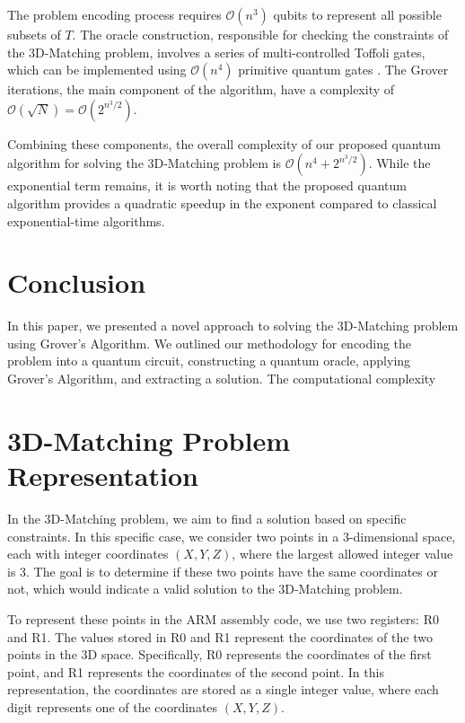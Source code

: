 The problem encoding process requires $\mathcal{O}(n^3)$ qubits to represent all possible subsets of $T$. The oracle construction, responsible for checking the constraints of the 3D-Matching problem, involves a series of multi-controlled Toffoli gates, which can be implemented using $\mathcal{O}(n^4)$ primitive quantum gates \cite{toffoli_complexity}. The Grover iterations, the main component of the algorithm, have a complexity of $\mathcal{O}(\sqrt{N}) = \mathcal{O}(2^{n^3/2})$.

Combining these components, the overall complexity of our proposed quantum algorithm for solving the 3D-Matching problem is $\mathcal{O}(n^4 + 2^{n^3/2})$. While the exponential term remains, it is worth noting that the proposed quantum algorithm provides a quadratic speedup in the exponent compared to classical exponential-time algorithms.

\section{Conclusion} \label{sec:conclusion}

In this paper, we presented a novel approach to solving the 3D-Matching problem using Grover's Algorithm. We outlined our methodology for encoding the problem into a quantum circuit, constructing a quantum oracle, applying Grover's Algorithm, and extracting a solution. The computational complexity

\section{3D-Matching Problem Representation}

In the 3D-Matching problem, we aim to find a solution based on specific constraints. In this specific case, we consider two points in a 3-dimensional space, each with integer coordinates $(X, Y, Z)$, where the largest allowed integer value is 3. The goal is to determine if these two points have the same coordinates or not, which would indicate a valid solution to the 3D-Matching problem.

To represent these points in the ARM assembly code, we use two registers: R0 and R1. The values stored in R0 and R1 represent the coordinates of the two points in the 3D space. Specifically, R0 represents the coordinates of the first point, and R1 represents the coordinates of the second point. In this representation, the coordinates are stored as a single integer value, where each digit represents one of the coordinates $(X, Y, Z)$.

